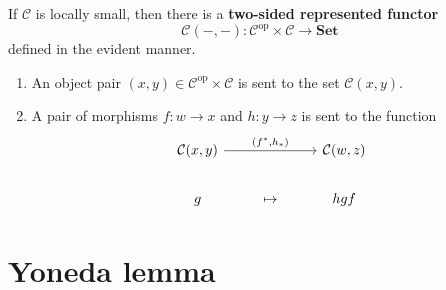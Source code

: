 \documentclass[12pt, oneside]{book}
\begin{document}
\begin{definition}
    If $\mathcal{C}$ is locally small, then there is a \textbf{two-sided represented functor}
    \begin{equation*}
        \mathcal{C}(-,-): \mathcal{C}^{\mathrm{op}} \times \mathcal{C} \rightarrow \mathbf{Set}
    \end{equation*}
    defined in the evident manner.
    \begin{enumerate}[label=(\roman*)]
        \item
              An object pair $(x, y) \in \mathcal{C}^{\mathrm{op}} \times \mathcal{C}$ is sent to the set $\mathcal{C}(x, y)$.
        \item
              A pair of morphisms $f: w \rightarrow x$ and $h: y \rightarrow z$ is sent to the function
              \begin{equation*}
                  \begin{tikzcd}
                      \mathcal{C}(x, y) \arrow[rr, "{\left(f^* ,h_*\right)}"] & & \mathcal{C}(w, z) \\
                      g     & \mapsto  & h g f
                  \end{tikzcd}
              \end{equation*}
    \end{enumerate}
\end{definition}




\section{Yoneda lemma} %
\end{document}
